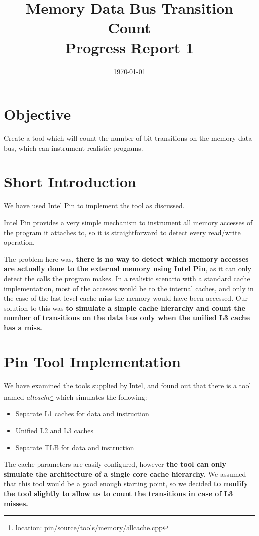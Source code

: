 \documentclass[a4paper,12pt]{article}
\title{Memory Data Bus Transition Count \\ Progress Report 1}
\date{\today}
\begin{document}
\fancyhf{}
\pagestyle{fancy}
\cfoot{\thepage}
\renewcommand{\headrulewidth}{0pt}
\renewcommand{\footrulewidth}{0.4pt}


\section{Objective}
Create a tool which will count the number of bit transitions on the memory data bus, which can instrument realistic programs.

\section{Short Introduction}
We have used Intel Pin to implement the tool as discussed.

Intel Pin provides a very simple mechanism to instrument all memory accesses of the program it attaches to, so it is straightforward to detect every read/write operation.

The problem here was, \textbf{there is no way to detect which memory accesses are actually done to the external memory using Intel Pin}, as it can only detect the calls the program makes. In a realistic scenario with a standard cache implementation, most of the accesses would be to the internal caches, and only in the case of the last level cache miss the memory would have been accessed. Our solution to this was \textbf{to simulate a simple cache hierarchy and count the number of transitions on the data bus only when the unified L3 cache has a miss.} 

\section{Pin Tool Implementation}
We have examined the tools supplied by Intel, and found out that there is a tool named \emph{allcache}\footnote{location: pin/source/tools/memory/allcache.cpp} which simulates the following:
\begin{itemize}
\item Separate L1 caches for data and instruction
\item Unified L2 and L3 caches
\item Separate TLB for data and instruction
\end{itemize}

The cache parameters are easily configured, however \textbf{the tool can only simulate the architecture of a single core cache hierarchy.} We assumed that this tool would be a good enough starting point, so we decided \textbf{to modify the tool slightly to allow us to count the transitions in case of L3 misses.} 
\end{document}
